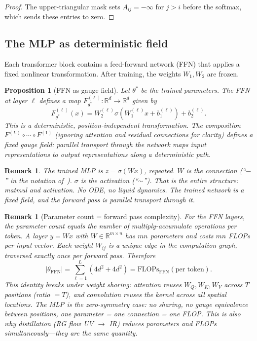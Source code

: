 \documentclass[11pt,a4paper]{article}
\newtheorem{proposition}[theorem]{Proposition}
\newtheorem{remark}[theorem]{Remark}
\newcommand{\R}{\mathbb{R}}
\begin{document}
\begin{proof}
The upper-triangular mask sets $A_{ij} = -\infty$ for $j > i$
before the softmax, which sends these entries to zero.
\end{proof}

\subsection{The MLP as deterministic field}

Each transformer block contains a feed-forward network (FFN)
that applies a fixed nonlinear transformation.
After training, the weights $W_1, W_2$ are frozen.

\begin{proposition}[FFN as gauge field]\label{prop:gauge}
Let $\theta^*$ be the trained parameters.
The FFN at layer $\ell$ defines a map
$F^{(\ell)}_{\theta^*} : \R^d \to \R^d$ given by
\[
F^{(\ell)}_{\theta^*}(x) = W_2^{(\ell)} \sigma(W_1^{(\ell)} x + b_1^{(\ell)}) + b_2^{(\ell)}.
\]
This is a deterministic, position-independent transformation.
The composition $F^{(L)} \circ \cdots \circ F^{(1)}$
(ignoring attention and residual connections for clarity)
defines a fixed gauge field: parallel transport through
the network maps input representations to output
representations along a deterministic path.
\end{proposition}

\begin{remark}
The trained MLP is $z = \sigma(Wx)$, repeated.
$W$ is the connection (``$-$'' in the notation of~\cite{Zhang2026Agent}).
$\sigma$ is the activation (``$\sim$'').
That is the entire structure: matmul and activation.
No ODE, no liquid dynamics.
The trained network is a fixed field, and the forward pass
is parallel transport through it.
\end{remark}

\begin{remark}[Parameter count = forward pass complexity]\label{rem:params-flops}
For the FFN layers, the parameter count equals the number of
multiply-accumulate operations per token.
A layer $y = Wx$ with $W \in \R^{m \times n}$ has $mn$ parameters
and costs $mn$ FLOPs per input vector.
Each weight $W_{ij}$ is a unique edge in the computation graph,
traversed exactly once per forward pass.
Therefore
\[
|\theta_{\mathrm{FFN}}|
= \sum_{\ell=1}^{L} (4d^2 + 4d^2)
= \mathrm{FLOPs}_{\mathrm{FFN}}(\text{per token}).
\]
This identity breaks under weight sharing:
attention reuses $W_Q, W_K, W_V$ across $T$ positions
(ratio $= T$), and convolution reuses the kernel across all
spatial locations.
The MLP is the zero-symmetry case: no sharing, no gauge
equivalence between positions, one parameter = one connection
= one FLOP\@.
This is also why distillation (RG flow UV $\to$ IR) reduces
parameters and FLOPs simultaneously---they are the same quantity.
\end{remark}
\end{document}
